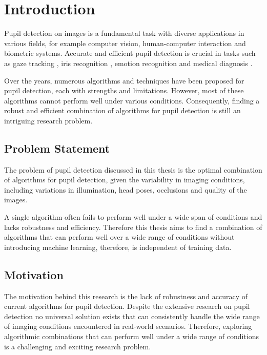 \newcommand{\package}{\emph}

\chapter{Introduction}
\label{chap:introduction}
Pupil detection on images is a fundamental task with diverse applications in various fields, for example computer vision, human-computer interaction and biometric systems. Accurate and efficient pupil detection is crucial in tasks such as gaze tracking \cite{arar_robust_2017}, iris recognition \cite{wildes_iris_1997}, emotion recognition \cite{zheng_multimodal_2014} and medical diagnosis \cite{grubisic_natural_2014}.

Over the years, numerous algorithms and techniques have been proposed for pupil detection, each with strengths and limitations. However, most of these algorithms cannot perform well under various conditions. Consequently, finding a robust and efficient combination of algorithms for pupil detection is still an intriguing research problem. 
\section{Problem Statement}
\label{sec:problem_statement}
The problem of pupil detection discussed in this thesis is the optimal combination of algorithms for pupil detection, given the variability in imaging conditions, including variations in illumination, head poses, occlusions and quality of the images.

A single algorithm often fails to perform well under a wide span of conditions and lacks robustness and efficiency. Therefore this thesis aims to find a combination of algorithms that can perform well over a wide range of conditions without introducing machine learning, therefore, is independent of training data. 
\section{Motivation}
\label{sec:motivation}
The motivation behind this research is the lack of robustness and accuracy of current algorithms for pupil detection. Despite the extensive research on pupil detection no universal solution exists that can consistently handle the wide range of imaging conditions encountered in real-world scenarios. Therefore, exploring algorithmic combinations that can perform well under a wide range of conditions is a challenging and exciting research problem. 

